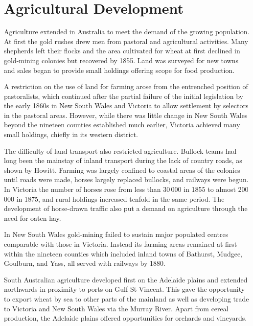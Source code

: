 \section*{Agricultural Development} 

Agriculture extended in Australia to meet the demand of the growing
population.  At first the gold rushes drew men from pastoral and
agricultural activities.  Many shepherds left their flocks and the
area cultivated for wheat at first declined in gold-mining colonies
but recovered by 1855.  Land was surveyed for new towns and sales
began to provide small holdings offering scope for food production.

A restriction on the use of land for farming arose from the entrenched
position of pastoralists,  which continued after
the partial failure of the initial legislation by the early 1860s in
New South Wales and Victoria to allow settlement by selectors in the
pastoral areas.  However, while there was little change in New South
Wales beyond the nineteen counties established much earlier, Victoria
achieved many small holdings, chiefly in its western
district.

The difficulty of land transport also restricted agriculture.  Bullock
teams had long been the mainstay of inland transport during the lack
of country roads, as shown by Howitt.  Farming was largely confined to
coastal areas of the colonies until roads were made, horses largely
replaced bullocks, and railways were begun.  In Victoria
 the number of
horses  rose from less than 30\,000 in 1855 to almost
200\,000 in 1875, and rural holdings increased tenfold in the same
period.  The development of horse-drawn traffic also put a demand on
agriculture through the need for oaten hay.

In New South Wales  gold-mining failed to
sustain major populated centres comparable with those in Victoria.
Instead its farming areas remained at first within the nineteen
counties which included inland towns of Bathurst, 
Mudgee,  Goulburn,
 and Yass,  all served with
railways by 1880.

South Australian  agriculture developed first
on the Adelaide plains and extended northwards in proximity to ports
on Gulf St Vincent.  This gave the opportunity to export wheat by sea
to other parts of the mainland as well as developing trade to Victoria
and New South Wales via the Murray River.  Apart
from cereal production, the Adelaide plains offered opportunities for
orchards and vineyards.

